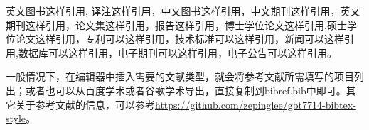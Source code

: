英文图书这样引用\cite{book:fan2014}, 译注这样引用\cite{book:xie2012}，中文图书这样引用\cite{book:xu2010}，中文期刊这样引用\cite{art:yuan2012}，英文期刊这样引用\cite{art:frese2013}，论文集这样引用\cite{inpro:jia2011}，报告这样引用\cite{tech:zh2013}，博士学位论文这样引用\cite{phd:ma2011},硕士学位论文这样引用\cite{master:ma2011}，专利可以这样引用\cite{pat:deng2006}，技术标准可以这样引用\cite{satand:gbt25100}，新闻可以这样引用\cite{news:yu2013},数据库可以这样引用\cite{DB:zhao2014}，电子期刊可以这样引用\cite{JOL:2008}，电子公告可以这样引用\cite{Online:2013}。


\noindent 一般情况下，在编辑器中插入需要的文献类型，就会将参考文献所需填写的项目列出；或者也可以从百度学术或者谷歌学术导出，直接复制到bibref.bib中即可。其它关于参考文献的信息，可以参考\url{https://github.com/zepinglee/gbt7714-bibtex-style}。